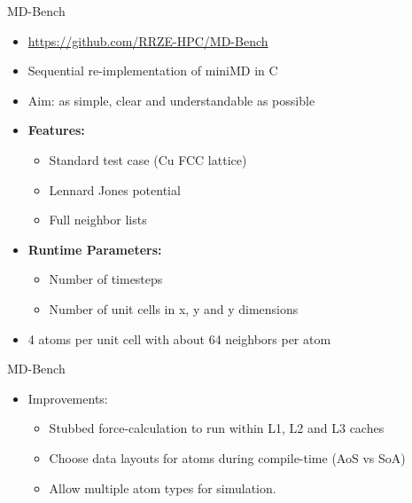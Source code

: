 \documentclass[aspectratio=43,t]{beamer}
\begin{document}
  \begin{frame}[fragile]{MD-Bench}
    \begin{itemize}
      \item \url{https://github.com/RRZE-HPC/MD-Bench}
      \item Sequential re-implementation of miniMD in C
      \item Aim: as simple, clear and understandable as possible
      \item \textbf{Features:}
      \begin{itemize}
        \item Standard test case (Cu FCC lattice)
        \item Lennard Jones potential
        \item Full neighbor lists
      \end{itemize}
      \item \textbf{Runtime Parameters:}
      \begin{itemize}
        \item Number of timesteps
        \item Number of unit cells in x, y and y dimensions 
      \end{itemize}
      \item 4 atoms per unit cell with about 64 neighbors per atom
    \end{itemize}
  \end{frame}

  \begin{frame}[fragile]{MD-Bench}
    \begin{itemize}
      \item Improvements:
      \begin{itemize}
        \item Stubbed force-calculation to run within L1, L2 and L3 caches
        \item Choose data layouts for atoms during compile-time (AoS vs SoA)
        \item Allow multiple atom types for simulation.
      \end{itemize}
    \end{itemize}
  \end{frame}
\end{document}
